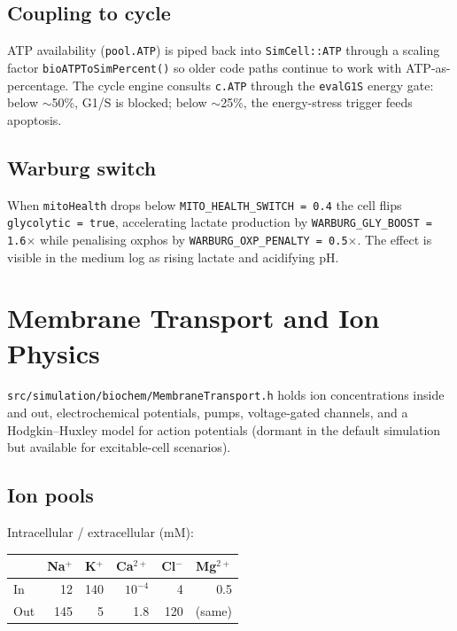 \documentclass[11pt,letterpaper,twoside,openany]{book}
\newcommand{\code}[1]{\texttt{#1}}
\newcommand{\file}[1]{\texttt{\small#1}}
\begin{document}
\section{Coupling to cycle}

ATP availability (\code{pool.ATP}) is piped back into
\code{SimCell::ATP} through a scaling factor
\code{bioATPToSimPercent()} so older code paths continue to work
with ATP-as-percentage. The cycle engine consults \code{c.ATP}
through the \code{evalG1S} energy gate: below $\sim$50\%, G1/S is
blocked; below $\sim$25\%, the energy-stress trigger feeds apoptosis.

\section{Warburg switch}

When \code{mitoHealth} drops below \code{MITO\_HEALTH\_SWITCH = 0.4}
the cell flips \code{glycolytic = true}, accelerating lactate
production by \code{WARBURG\_GLY\_BOOST = 1.6\(\times\)} while
penalising oxphos by \code{WARBURG\_OXP\_PENALTY = 0.5\(\times\)}.
The effect is visible in the medium log as rising lactate and
acidifying pH.

\chapter{Membrane Transport and Ion Physics}
\label{ch:membrane}

\file{src/simulation/biochem/MembraneTransport.h} holds ion
concentrations inside and out, electrochemical potentials, pumps,
voltage-gated channels, and a Hodgkin--Huxley model for action
potentials (dormant in the default simulation but available for
excitable-cell scenarios).

\section{Ion pools}

Intracellular / extracellular (mM):
\begin{center}
\begin{tabular}{lrrrrr}
\toprule
         & Na$^+$ & K$^+$ & Ca$^{2+}$ & Cl$^-$ & Mg$^{2+}$\\ \midrule
In       & 12     & 140   & $10^{-4}$ & 4      & 0.5\\
Out      & 145    &  5    & 1.8       & 120    & (same)\\
\bottomrule
\end{tabular}
\end{center}
\end{document}
